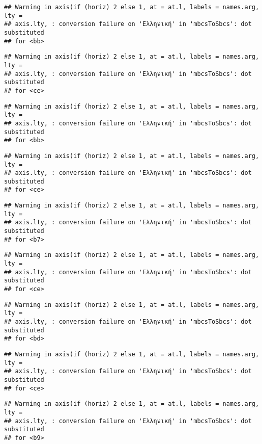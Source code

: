 \documentclass[
]{article}
\begin{document}
\begin{verbatim}
## Warning in axis(if (horiz) 2 else 1, at = at.l, labels = names.arg, lty =
## axis.lty, : conversion failure on 'Ελληνική' in 'mbcsToSbcs': dot substituted
## for <bb>
\end{verbatim}

\begin{verbatim}
## Warning in axis(if (horiz) 2 else 1, at = at.l, labels = names.arg, lty =
## axis.lty, : conversion failure on 'Ελληνική' in 'mbcsToSbcs': dot substituted
## for <ce>
\end{verbatim}

\begin{verbatim}
## Warning in axis(if (horiz) 2 else 1, at = at.l, labels = names.arg, lty =
## axis.lty, : conversion failure on 'Ελληνική' in 'mbcsToSbcs': dot substituted
## for <bb>
\end{verbatim}

\begin{verbatim}
## Warning in axis(if (horiz) 2 else 1, at = at.l, labels = names.arg, lty =
## axis.lty, : conversion failure on 'Ελληνική' in 'mbcsToSbcs': dot substituted
## for <ce>
\end{verbatim}

\begin{verbatim}
## Warning in axis(if (horiz) 2 else 1, at = at.l, labels = names.arg, lty =
## axis.lty, : conversion failure on 'Ελληνική' in 'mbcsToSbcs': dot substituted
## for <b7>
\end{verbatim}

\begin{verbatim}
## Warning in axis(if (horiz) 2 else 1, at = at.l, labels = names.arg, lty =
## axis.lty, : conversion failure on 'Ελληνική' in 'mbcsToSbcs': dot substituted
## for <ce>
\end{verbatim}

\begin{verbatim}
## Warning in axis(if (horiz) 2 else 1, at = at.l, labels = names.arg, lty =
## axis.lty, : conversion failure on 'Ελληνική' in 'mbcsToSbcs': dot substituted
## for <bd>
\end{verbatim}

\begin{verbatim}
## Warning in axis(if (horiz) 2 else 1, at = at.l, labels = names.arg, lty =
## axis.lty, : conversion failure on 'Ελληνική' in 'mbcsToSbcs': dot substituted
## for <ce>
\end{verbatim}

\begin{verbatim}
## Warning in axis(if (horiz) 2 else 1, at = at.l, labels = names.arg, lty =
## axis.lty, : conversion failure on 'Ελληνική' in 'mbcsToSbcs': dot substituted
## for <b9>
\end{verbatim}
\end{document}
